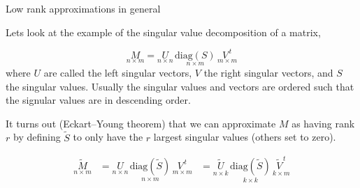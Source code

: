 \documentclass[11pt,ignorenonframetext,]{beamer}
\begin{document}
\begin{frame}{Low rank approximations in general}

Lets look at the example of the singular value decomposition of a
matrix,

\[ \underset{n \times m}{M} = \underset{n \times n}{U}\,\underset{n \times m}{\text{diag}(S)}\,\underset{m \times m}{V^{\,t}} \]
where \(U\) are called the left singular vectors, \(V\) the right
singular vectors, and \(S\) the singular values. Usually the singular
values and vectors are ordered such that the signular values are in
descending order.

\pause

It turns out (Eckart--Young theorem) that we can approximate \(M\) as
having rank \(r\) by defining \(\tilde S\) to only have the \(r\)
largest singular values (others set to zero).

\[ 
\begin{aligned}
\underset{n \times m}{\tilde M} 
  &= \underset{n \times n}{U}\,\underset{n \times m}{\text{diag}(\tilde S)}\,\underset{m \times m}{V^{\,t}} 
  &= \underset{n \times k}{\tilde U}\,\underset{k \times k}{\text{diag}(\tilde S)}\,\underset{k \times m}{\tilde{V}^{\,t}} 
\end{aligned}
\]

\end{frame}
\end{document}
